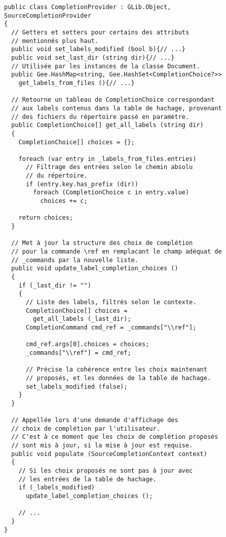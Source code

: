 \documentclass[a4paper,11pt]{report}
\begin{document}
\begin{lstlisting}[frame=single]
public class CompletionProvider : GLib.Object, SourceCompletionProvider
{
  // Getters et setters pour certains des attributs
  // mentionnés plus haut.
  public void set_labels_modified (bool b){// ...}
  public void set_last_dir (string dir){// ...}
  // Utilisée par les instances de la classe Document.
  public Gee.HashMap<string, Gee.HashSet<CompletionChoice?>> 
    get_labels_from_files (){// ...}
  
  // Retourne un tableau de CompletionChoice correspondant
  // aux labels contenus dans la table de hachage, provenant
  // des fichiers du répertoire passé en paramètre.
  public CompletionChoice[] get_all_labels (string dir)
  {
    CompletionChoice[] choices = {};
    
    foreach (var entry in _labels_from_files.entries)
      // Filtrage des entrées selon le chemin absolu
      // du répertoire.
      if (entry.key.has_prefix (dir))
        foreach (CompletionChoice c in entry.value)
          choices += c;
    
    return choices;
  }
  
  // Met à jour la structure des choix de complétion
  // pour la commande \ref en remplacant le champ adéquat de
  // _commands par la nouvelle liste.
  public void update_label_completion_choices ()
  {
    if (_last_dir != "")
    {
      // Liste des labels, filtrés selon le contexte.
      CompletionChoice[] choices =
        get_all_labels (_last_dir);
      CompletionCommand cmd_ref = _commands["\\ref"];

      cmd_ref.args[0].choices = choices;
      _commands["\\ref"] = cmd_ref;

      // Précise la cohérence entre les choix maintenant
      // proposés, et les données de la table de hachage.
      set_labels_modified (false);
    }
  }
  
  // Appellée lors d'une demande d'affichage des
  // choix de complétion par l'utilisateur.
  // C'est à ce moment que les choix de complétion proposés
  // sont mis à jour, si la mise à jour est requise.
  public void populate (SourceCompletionContext context)
  {
    // Si les choix proposés ne sont pas à jour avec
    // les entrées de la table de hachage.
    if (_labels_modified)
      update_label_completion_choices ();
    
    // ...
  }
}
\end{lstlisting}
\end{document}
